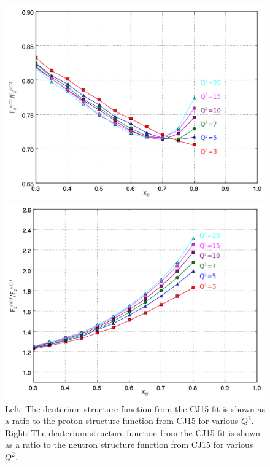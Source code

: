 \documentclass[oneside]{article}
\begin{document}
  \begin{figure}
\begin{minipage}{0.5\textwidth}
 \includegraphics[width=\textwidth]{plots/dpratio_CJ.png}
\end{minipage}\hfill\begin{minipage}{0.5\textwidth}
 \includegraphics[width=\textwidth]{plots/dnratio_CJ.png}
 \end{minipage}
  \caption[Deuteron ratios from CJ15]{Left: The deuterium structure function from the CJ15 fit is shown as a ratio to the proton structure function from CJ15 for various $Q^2$. Right: The deuterium structure function from the CJ15 fit is shown as a ratio to the neutron structure function from CJ15 for various $Q^2$.}
  \label{fig:dratio_cj}
\end{figure} 
\end{document}
